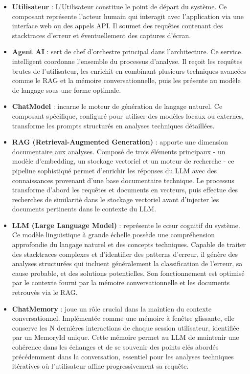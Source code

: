 \documentclass[12pt,a4paper]{report}
\begin{document}
	\begin{itemize}
		
		\item \textbf{Utilisateur} : L'Utilisateur constitue le point de départ du système. Ce composant représente l'acteur humain qui interagit avec l'application via une interface web ou des appels API. Il soumet des requêtes contenant des stacktraces d'erreur et éventuellement des captures d'écran.
		
		\item \textbf{Agent AI} : sert de chef d'orchestre principal dans l'architecture. Ce service intelligent coordonne l'ensemble du processus d'analyse. Il reçoit les requêtes brutes de l'utilisateur, les enrichit en combinant plusieurs techniques avancées comme le RAG et la mémoire conversationnelle, puis les présente au modèle de langage sous une forme optimale.
		
		\item \textbf{ChatModel} : incarne le moteur de génération de langage naturel. Ce composant spécifique, configuré pour utiliser des modèles locaux ou externes, transforme les prompts structurés en analyses techniques détaillées.
		
		\item \textbf{RAG (Retrieval-Augmented Generation)} : apporte une dimension documentaire aux analyses. Composé de trois éléments principaux - un modèle d'embedding, un stockage vectoriel et un moteur de recherche - ce pipeline sophistiqué permet d'enrichir les réponses du LLM avec des connaissances provenant d'une base documentaire technique. Le processus transforme d'abord les requêtes et documents en vecteurs, puis effectue des recherches de similarité dans le stockage vectoriel avant d'injecter les documents pertinents dans le contexte du LLM.
		
		\item \textbf{LLM (Large Language Model)} : représente le cœur cognitif du système. Ce modèle linguistique à grande échelle possède une compréhension approfondie du langage naturel et des concepts techniques. Capable de traiter des stacktraces complexes et d'identifier des patterns d'erreur, il génère des analyses structurées qui incluent généralement la classification de l'erreur, sa cause probable, et des solutions potentielles. Son fonctionnement est optimisé par le contexte fourni par la mémoire conversationnelle et les documents retrouvés via le RAG.
		
		\item \textbf{ChatMemory} : joue un rôle crucial dans la maintien du contexte conversationnel. Implémentée comme une mémoire à fenêtre glissante, elle conserve les N dernières interactions de chaque session utilisateur, identifiée par un MemoryId unique. Cette mémoire permet au LLM de maintenir une cohérence dans les échanges et de se souvenir des points clés abordés précédemment dans la conversation, essentiel pour les analyses techniques itératives où l'utilisateur affine progressivement sa requête.
		
	\end{itemize}
	
\end{document}
